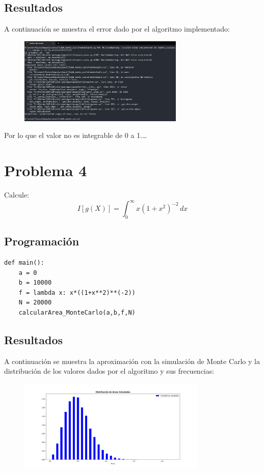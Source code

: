 \documentclass[a4paper,12pt]{article}
\begin{document}
    \subsection{Resultados}
    A continuación se muestra el error dado por el algoritmo implementado:
    \begin{figure}[h]
        \centering
        \includegraphics[width=0.7\textwidth]{console_3.png}
    \end{figure}
    
    Por lo que el valor no es integrable de 0 a 1.\ldots\\
	\newpage
    \section{Problema 4}
    Calcule:
    \begin{equation}
        I[g(X)] = \int_{0}^{\infty} x(1 + x^2)^{-2} \,dx
    \end{equation}

    \subsection{Programación}
\begin{lstlisting}
def main():
    a = 0
    b = 10000
    f = lambda x: x*((1+x**2)**(-2))
    N = 20000
    calcularArea_MonteCarlo(a,b,f,N)
\end{lstlisting}
\subsection{Resultados}
A continuación se muestra la aproximación con la simulación de Monte Carlo y 
la distribución de los valores dados por el algoritmo y sus frecuencias:
\begin{figure}[h]
    \centering
    \includegraphics[width=0.8\textwidth]{ejer4.png}
\end{figure}
\end{document}
